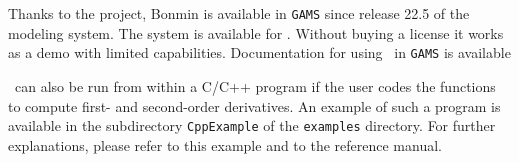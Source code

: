 Thanks to the  project, 
Bonmin is available in {\tt GAMS} since release 22.5 of the  modeling system. 
The system is available for . Without buying a license it works as a demo with limited capabilities. Documentation for using \Bonmin\ in {\tt GAMS} is available


\Bonmin\ can also be run from within a C/C++ program if the user codes
the functions to compute first- and second-order derivatives.
An example of such a program is available in the subdirectory {\tt CppExample} of
the {\tt examples} directory. For further explanations, please refer to this example and to the reference manual.
